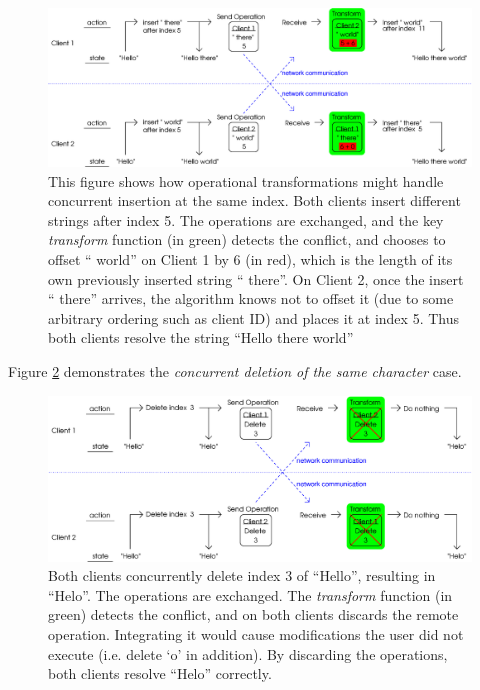 \documentclass[12pt,a4paper,twoside,openright]{report}
\begin{document}
	\begin{figure}[H]
	\centering
	\includegraphics[width=1\linewidth]{figs/ot1.eps}
	\caption[Operational Transformations --- concurrent insertion]{This figure shows how operational transformations might handle concurrent insertion at the same index. Both clients insert different strings after index 5. The operations are exchanged, and the key \textit{transform} function (in green) detects the conflict, and chooses to offset `` world'' on Client 1 by 6 (in red), which is the length of its own previously inserted string `` there''. On Client 2, once the insert `` there'' arrives, the algorithm knows not to offset it (due to some arbitrary ordering such as client ID) and places it at index 5. Thus both clients resolve the string ``Hello there world''}
	\label{fig:ot1}
	\end{figure}
	
	Figure \ref{fig:ot2} demonstrates the \textit{concurrent deletion of the same character} case.

	\begin{figure}[H]
	\centering
	\includegraphics[width=1\linewidth]{figs/ot2.eps}
	\caption[Operational Transformations --- concurrent deletion]{Both clients concurrently delete index 3 of ``Hello'', resulting in ``Helo''. The operations are exchanged. The \textit{transform} function (in green) detects the conflict, and on both clients discards the remote operation. Integrating it would cause modifications the user did not execute (i.e. delete `o' in addition). By discarding the operations, both clients resolve ``Helo'' correctly.}
	\label{fig:ot2}
	\end{figure}
	
\end{document}
